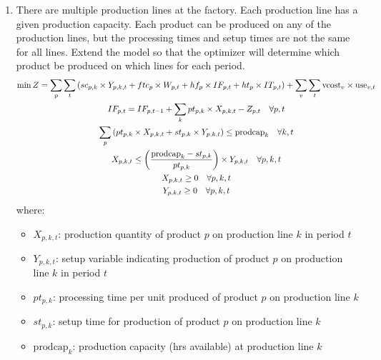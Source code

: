 \documentclass[10pt]{article}
\begin{document}
\begin{enumerate}
    \begin{gather*}
        \sum_{\tau  = 0}^3 X_{t + \tau} \le u\quad\forall t = 1,\dots, T - 3
    \end{gather*}
    (solution says:)
    \begin{gather*}
        \sum_{k = t - 3}^t\sum_v\text{Use}_{v, k}\le u\quad\forall t\ge 4
    \end{gather*}
    \item There are multiple production lines at the factory. Each production line has a given production capacity. Each product can be produced on any of the production lines, but the processing times and setup times are not the same for all lines. Extend the model so that the optimizer will determine which product be produced on which lines for each period. 
    \begin{gather*}
        \min Z = \sum_p\sum_t\left(sc_{p, k}\times Y_{p, k, t} + ftc_p\times W_{p, t} + hf_p\times IF_{p, t} + ht_p\times IT_{p, t}\right) + \sum_v\sum_t\text{vcost}_v\times \text{use}_{v, t}\notag\\
        IF_{p, t} = IF_{p, t - 1} + \sum_k pt_{p, k}\times X_{p, k, t} - Z_{p, t}\quad\forall p, t\\
        \sum_p\left(pt_{p, k}\times X_{p, k, t} + st_{p, k}\times Y_{p, k , t}\right)\le \text{prodcap}_k\quad\forall k, t\\
        X_{p, k, t}\le \left(\frac{\text{prodcap}_k - st_{p, k}}{pt_{p, k}}\right)\times Y_{p, k, t}\quad\forall p, k, t\\
        X_{p, k, t}\ge 0 \quad\forall p, k , t\\
        Y_{p, k, t}\ge 0 \quad\forall p, k , t
    \end{gather*}
    where: 
    \begin{itemize}
        \item $X_{p, k, t} $: production quantity of product $ p $ on production line $k $ in period $t $
        \item $Y_{p, k, t} $: setup variable indicating production of product $ p $ on production line $k $ in period $t $
        \item $pt_{p, k} $: processing time per unit produced of product $ p $ on production line $k $
        \item $st_{p, k} $: setup time for production of product $ p $ on production line $k $
        \item $\text{prodcap}_k $: production capacity (hrs available) at production line $k $
    \end{itemize}
\end{enumerate}
\end{document}
